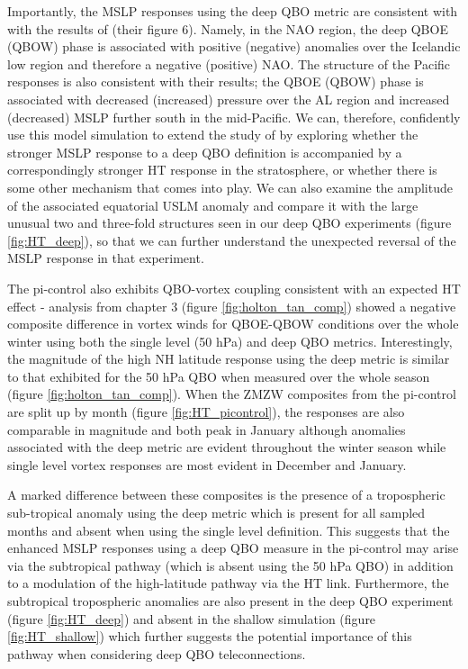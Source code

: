 Importantly, the MSLP responses using the deep QBO metric are consistent with with the results of \cite{andrewsObserved2019d} (their figure 6). Namely, in the NAO region, the deep QBOE (QBOW) phase is associated with positive (negative) anomalies over the Icelandic low region and therefore a negative (positive) NAO. The structure of the Pacific responses is also consistent with their results; the QBOE (QBOW) phase is associated with decreased (increased) pressure over the AL region and increased (decreased) MSLP further south in the mid-Pacific. We can, therefore, confidently use this model simulation to extend the study of \cite{andrewsObserved2019d} by exploring whether the stronger MSLP response to a deep QBO definition is accompanied by a correspondingly stronger HT response in the stratosphere, or whether there is some other mechanism that comes into play. We can also examine the amplitude of the associated equatorial USLM anomaly and compare it with the large unusual two and three-fold structures seen in our deep QBO experiments (figure \ref{fig:HT_deep}), so that we can further understand the unexpected reversal of the MSLP response in that experiment.    

The pi-control also exhibits QBO-vortex coupling consistent with an expected HT effect - analysis from chapter 3 (figure \ref{fig:holton_tan_comp}) showed a negative composite difference in vortex winds for QBOE-QBOW conditions over the whole winter using both the single level (50 hPa) and deep QBO metrics. Interestingly, the magnitude of the high NH latitude response using the deep metric is similar to that exhibited for the 50 hPa QBO when measured over the whole season (figure \ref{fig:holton_tan_comp}). When the ZMZW composites from the pi-control are split up by month (figure \ref{fig:HT_picontrol}), the responses are also comparable in magnitude and both peak in January although anomalies associated with the deep metric are evident throughout the winter season while single level vortex responses are most evident in December and January.

A marked difference between these composites is the presence of a tropospheric sub-tropical anomaly using the deep metric which is present for all sampled months and absent when using the single level definition. This suggests that the enhanced MSLP responses using a deep QBO measure in the pi-control may arise via the subtropical pathway (which is absent using the 50 hPa QBO) in addition to a modulation of the high-latitude pathway via the HT link. Furthermore, the subtropical tropospheric anomalies are also present in the deep QBO experiment (figure \ref{fig:HT_deep}) and absent in the shallow simulation (figure \ref{fig:HT_shallow}) which further suggests the potential importance of this pathway when considering deep QBO teleconnections.

